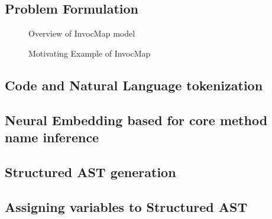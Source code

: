 \documentclass[sigconf,review,anonymous]{article}
\begin{document}
\subsection{Problem Formulation}
\begin{figure}
   
        \caption{Overview of InvocMap model}
        \label{figOverview} 
\end{figure}
\begin{figure}
        \caption{Motivating Example of InvocMap}
        \label{figMotivatingExample} 
\end{figure}
\subsection{Code and Natural Language tokenization}
\subsection{Neural Embedding based for core method name inference}

\subsection{Structured AST generation}
\subsection{Assigning variables to Structured AST}
\end{document}
